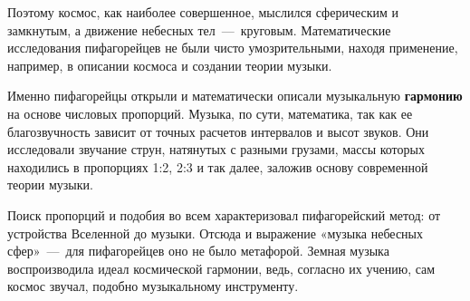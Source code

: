 
Поэтому космос, как наиболее совершенное, мыслился сферическим и замкнутым, а движение небесных тел~---~круговым. Математические исследования пифагорейцев не были чисто умозрительными, находя применение, например, в описании космоса и создании теории музыки.

Именно пифагорейцы открыли и математически описали музыкальную \textbf{гармонию} на основе числовых пропорций. Музыка, по сути, математика, так как ее благозвучность зависит от точных расчетов интервалов и высот звуков. Они исследовали звучание струн, натянутых с разными грузами, массы которых находились в пропорциях 1:2, 2:3 и так далее, заложив основу современной теории музыки.

Поиск пропорций и подобия во всем характеризовал пифагорейский метод: от устройства Вселенной до музыки. Отсюда и выражение «музыка небесных сфер»~---~для пифагорейцев оно не было метафорой. Земная музыка воспроизводила идеал космической гармонии, ведь, согласно их учению, сам космос звучал, подобно музыкальному инструменту.

